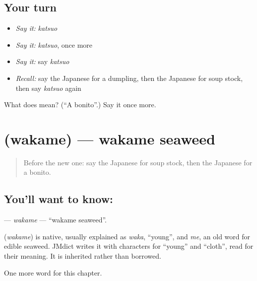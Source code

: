 \subsection*{Your turn}
\begin{itemize}
\raggedright
  \item \emph{Say it:} \emph{katsuo}
  \item \emph{Say it:} \emph{katsuo}, once more
  \item \emph{Say it:} say \emph{katsuo}
  \item \emph{Recall:} say the Japanese for a dumpling, then the Japanese for soup stock, then say \emph{katsuo} again
\end{itemize}

\begin{tcolorbox}[breakable,colback=teal!4,colframe=teal!35!black,title={Before you move on}]
What does  mean? (\textquotedblleft{}A bonito\textquotedblright{}.) Say it once more.
\end{tcolorbox}
\section[\texorpdfstring{\ja{わかめ} (wakame)}{わかめ (wakame)}]{ (wakame) — wakame seaweed}

\label{lesson:JA-C113-wakame}



\begin{quote}
Before the new one: say the Japanese for soup stock, then the Japanese for a bonito.
\end{quote}

\subsection*{You'll want to know: }
\textbf{} — \emph{wakame} — \textquotedblleft{}wakame seaweed\textquotedblright{}.

\begin{cousinweb}
\textbf{} (\emph{wakame}) is native, usually explained as \emph{waka}, \textquotedblleft{}young\textquotedblright{}, and \emph{me}, an old word for edible seaweed. JMdict writes it with characters for \textquotedblleft{}young\textquotedblright{} and \textquotedblleft{}cloth\textquotedblright{}, read for their meaning. It is inherited rather than borrowed.
\end{cousinweb}

\begin{grammarlens}[title={What you've built}]
One more word for this chapter.
\end{grammarlens}

